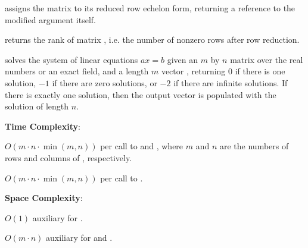\begin{compactitem}
  \item {} assigns the matrix  to its reduced row echelon form, returning a reference to the modified argument itself.
  \item {} returns the rank of matrix , i.e. the number of nonzero rows after row reduction.
  \item {} solves the system of linear equations $ax = b$ given an $m$ by $n$ matrix  over the real numbers or an exact field, and a length $m$ vector , returning $0$ if there is one solution, $-1$ if there are zero solutions, or $-2$ if there are infinite solutions. If there is exactly one solution, then the output vector  is populated with the solution of length $n$.
\end{compactitem}

\textbf{Time Complexity}:
\begin{compactitem}
  \item $O(m \cdot n \cdot \min\left(m, n\right))$ per call to  and , where $m$ and $n$ are the numbers of rows and columns of , respectively.
  \item $O(m \cdot n \cdot \min\left(m, n\right))$ per call to .
\end{compactitem}

\textbf{Space Complexity}:
\begin{compactitem}
  \item $O(1)$ auxiliary for .
  \item $O(m \cdot n)$ auxiliary for  and .
\end{compactitem}

